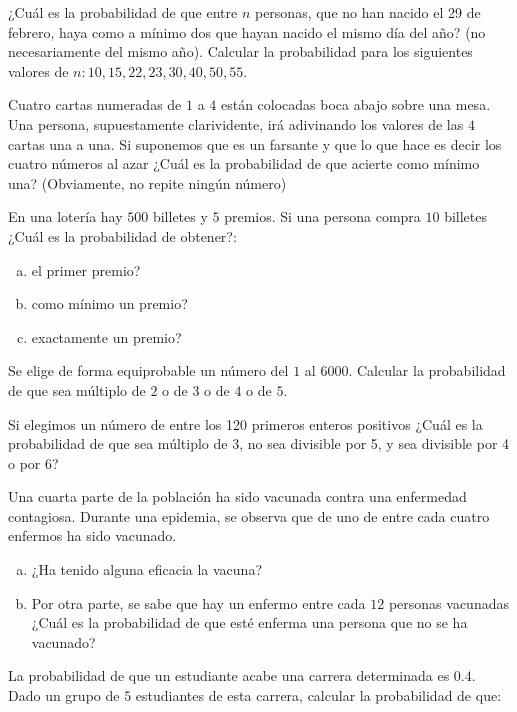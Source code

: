 \documentclass[12pt]{article}
\begin{document}
\probl  ¿Cuál es la probabilidad de  que  entre
 $n$ personas, que no han nacido el 29 de
febrero,  haya  como a mínimo dos que hayan nacido el mismo día del año? (no
necesariamente del mismo año). Calcular la probabilidad para los siguientes valores de
$n: 10, 15, 22, 23, 30, 40, 50, 55$. 

\probl  Cuatro cartas numeradas de $1$ a $4$ están colocadas  boca abajo sobre una  mesa.
Una persona, supuestamente clarividente, irá adivinando  los valores de las $4$ cartas
una a una. Si suponemos que es un farsante y que lo que hace  es decir los cuatro números
al azar ¿Cuál es la probabilidad de   que acierte como mínimo una? (Obviamente, no
repite ningún número) 

\probl  En una lotería hay $500$ billetes y $5$ premios. Si una persona compra $10$
billetes ¿Cuál es la probabilidad de obtener?:
\begin{enumerate}[a)]
\item el primer premio?
\item como  mínimo un premio?
\item exactamente un premio?
\end{enumerate} 

\probl  Se elige de forma equiprobable un número del $1$ al
$6000$. Calcular la probabilidad de que sea múltiplo de $2$ o de
$3$ o de $4$ o de $5$. 


\probl  Si elegimos un número de entre los 120 primeros enteros
  positivos  ¿Cuál es la probabilidad de  que  sea
múltiplo de $3$, no sea divisible por 5, y sea divisible por 4 o
por 6? 

\probl  Una cuarta parte de la población ha sido  vacunada contra
una enfermedad contagiosa. Durante una epidemia, se observa que de
  uno de entre cada cuatro enfermos ha sido vacunado.
\begin{enumerate}[a)]
\item ¿Ha tenido alguna eficacia la vacuna?
\item Por otra parte, se sabe que hay un enfermo  entre cada $12$ personas
vacunadas ¿Cuál es la probabilidad de que  esté enferma una
persona que no se ha vacunado?
\end{enumerate}

\probl La probabilidad de  que un estudiante  acabe una carrera determinada es $0.4$.
Dado un grupo de $5$ estudiantes de esta carrera, calcular la probabilidad de que:
\end{document}
